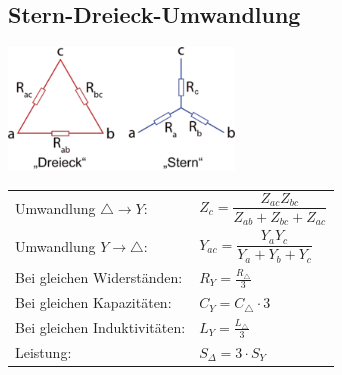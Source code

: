 	
	\subsection{Stern-Dreieck-Umwandlung}%
	  \begin{minipage}[lt]{7.5 cm}
	    \includegraphics[width=6cm]{bilder/stern-dreieck.png} 
	  \end{minipage}
	  \begin{minipage}[rt]{9.35 cm} %
      \renewcommand{\arraystretch}{2}
	  \begin{tabular}{ll}
	Umwandlung $\triangle \rightarrow Y$: 
		&$Z_{c} = \dfrac{Z_{ac} Z_{bc}}{Z_{ab}+Z_{bc}+Z_{ac}}$\\
	Umwandlung $Y \rightarrow \triangle$: 
		&$Y_{ac}=\dfrac{Y_{a} Y_{c}}{Y_{a}+Y_{b}+Y_{c}}$\\
	Bei gleichen Widerst\"anden:
	&$R_Y = \frac{R_\triangle}{3}$ \\
	Bei gleichen Kapazit\"aten:
	&$C_Y = C_\triangle \cdot 3 $ \\
	Bei gleichen Induktivit\"aten:
	&$L_Y = \frac{L_\triangle}{3}$\\
	Leistung:
	& $ S_{\Delta} = 3 \cdot S_Y$
	  \end{tabular}
      \renewcommand{\arraystretch}{1}
	  \end{minipage}
	
